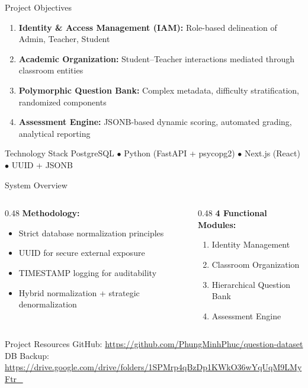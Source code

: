 \documentclass[aspectratio=169, 10pt]{beamer}
\begin{document}
\begin{frame}{Project Objectives}
    \begin{enumerate}
        \item \textbf{Identity \& Access Management (IAM):} Role-based delineation of Admin, Teacher, Student
        \item \textbf{Academic Organization:} Student–Teacher interactions mediated through classroom entities
        \item \textbf{Polymorphic Question Bank:} Complex metadata, difficulty stratification, randomized components
        \item \textbf{Assessment Engine:} JSONB-based dynamic scoring, automated grading, analytical reporting
    \end{enumerate}
    \vspace{0.3cm}
    \begin{block}{Technology Stack}
        PostgreSQL $\bullet$ Python (FastAPI + psycopg2) $\bullet$ Next.js (React) $\bullet$ UUID + JSONB
    \end{block}
\end{frame}


\begin{frame}{System Overview}
    \begin{columns}[T]
        \begin{column}{0.48\textwidth}
            \textbf{Methodology:}
            \begin{itemize}
                \item Strict database normalization principles
                \item UUID for secure external exposure
                \item TIMESTAMP logging for auditability
                \item Hybrid normalization + strategic denormalization
            \end{itemize}
        \end{column}
        \begin{column}{0.48\textwidth}
            \textbf{4 Functional Modules:}
            \begin{enumerate}
                \item Identity Management
                \item Classroom Organization
                \item Hierarchical Question Bank
                \item Assessment Engine
            \end{enumerate}
        \end{column}
    \end{columns}
    \vspace{0.3cm}
    \begin{block}{Project Resources}
        \footnotesize
        GitHub: \url{https://github.com/PhungMinhPhuc/question-dataset}\\
        DB Backup: \url{https://drive.google.com/drive/folders/1SPMrp4qBzDp1KWkO36wYqUqM9LMyFtr_}
    \end{block}
\end{frame}
\end{document}

